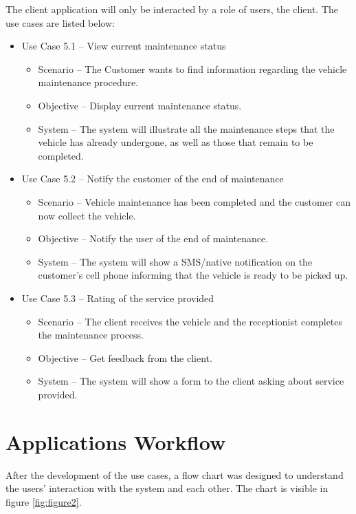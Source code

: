 The client application will only be interacted by a role of users, the client.
The use cases are listed below:

\begin{itemize}
  \item Use Case 5.1 – View current maintenance status
  \begin{itemize}
    \item Scenario – The Customer wants to find information regarding the vehicle maintenance procedure.
    \item Objective – Display current maintenance status.
    \item System – The system will illustrate all the maintenance steps that the vehicle has already undergone, as well as those that remain to be completed. 
  \end{itemize}
  \item Use Case 5.2 – Notify the customer of the end of maintenance 
  \begin{itemize}
    \item Scenario – Vehicle maintenance has been completed and the customer can now collect the vehicle.
    \item Objective – Notify the user of the end of maintenance.
    \item System – The system will show a SMS/native notification on the customer's cell phone informing that the vehicle is ready to be picked up. 
  \end{itemize}
  \item Use Case 5.3 – Rating of the service provided
  \begin{itemize}
    \item Scenario – The client receives the vehicle and the receptionist completes the maintenance process.
    \item Objective – Get feedback from the client.
    \item System – The system will show a form to the client asking about service provided. 
  \end{itemize}
\end{itemize}
\hfill \break

\section{Applications Workflow}

After the development of the use cases, a flow chart was designed to understand the users' interaction with the system and each other. The chart is visible in figure \ref{fig:figure2}.

